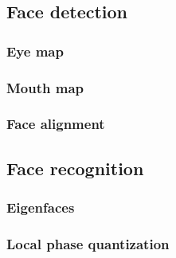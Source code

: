\subsection{Face detection}
\subsubsection{Eye map}
\label{sub:FaceDetection}


\subsubsection{Mouth map}


\subsubsection{Face alignment}


\subsection{Face recognition}
\label{sub:FaceRecognition}


\subsubsection{Eigenfaces}
\label{subs:Eigenfaces}


\subsubsection{Local phase quantization}
\label{subs:LocalPhaseQuantization}

